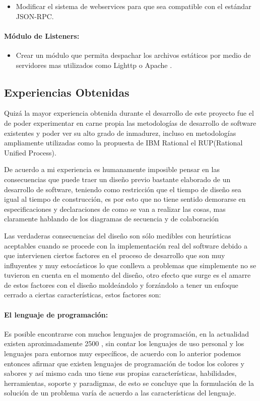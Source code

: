 \begin{itemize}
	\item Modificar el sistema de webservices para que sea compatible con el estándar JSON-RPC. \cite{json-rpc}
\end{itemize}

\paragraph{Módulo de Listeners:}

\begin{itemize}
	\item Crear un módulo que permita despachar los archivos estáticos por medio de servidores mas utilizados como Lighttp \cite{lighttp} o Apache \cite{apache}.
\end{itemize}


\subsection{Experiencias Obtenidas}

Quizá la mayor experiencia obtenida durante el desarrollo de este proyecto fue el de poder experimentar en carne propia las metodologías de desarrollo de software existentes y poder ver su alto grado de inmadurez, incluso en metodologías ampliamente utilizadas como la propuesta de IBM Rational el RUP(Rational Unified Process).

De acuerdo a mi experiencia es humanamente imposible pensar en las consecuencias que puede traer un diseño previo bastante elaborado de un desarrollo de software, teniendo como restricción que el tiempo de diseño sea igual al tiempo de construcción, es por esto que no tiene sentido demorarse en especificaciones y declaraciones de como se van a realizar las cosas, mas claramente hablando de los diagramas de secuencia y de colaboración

Las verdaderas consecuencias del diseño son sólo medibles con heurísticas aceptables cuando se procede con la implementación real del software debido a que intervienen ciertos factores en el proceso de desarrollo que son muy influyentes y muy estocásticos lo que conlleva a problemas que simplemente no se tuvieron en cuenta en el momento del diseño, otro efecto que surge es el amarre de estos factores con el diseño moldeándolo y forzándolo a tener un enfoque cerrado a ciertas características, estos factores son:

\paragraph{El lenguaje de programación:}
Es posible encontrarse con muchos lenguajes de programación, en la actualidad existen aproximadamente 2500 \cite{bd_lenguajes_programacion}, sin contar los lenguajes de uso personal y los lenguajes para entornos muy específicos, de acuerdo con lo anterior podemos entonces afirmar que existen lenguajes de programación de todos los colores y sabores y así mismo cada uno tiene sus propias características, habilidades, herramientas, soporte y paradigmas, de esto se concluye que la formulación de la solución de un problema varía de acuerdo a las características del lenguaje.


